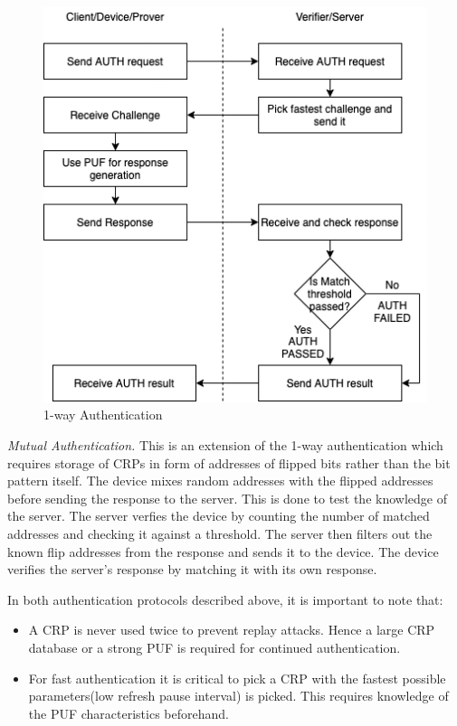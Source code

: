 \documentclass[journal, a4paper]{IEEEtran}
\begin{document}
\begin{figure}[!hbt]
    \begin{center}
    \includegraphics[scale=0.5]{figs/authentication.png}
    \caption{1-way Authentication}
    \label{fig:one_way}
    \end{center}
\end{figure}

\textit{Mutual Authentication.} This is an extension of the 1-way authentication which requires storage of CRPs in form of addresses of flipped bits rather than the bit pattern itself. The device mixes random addresses with the flipped addresses before sending the response to the server. This is done to test the knowledge of the server. The server verfies the device by counting the number of matched addresses and checking it against a threshold. The server then filters out the known flip addresses from the response and sends it to the device. The device verifies the server's response by matching it with its own response.

In both authentication protocols described above, it is important to note that:
\begin{itemize}
    \item A CRP is never used twice to prevent replay attacks. Hence a large CRP database or a strong PUF is required for continued authentication.
    \item For fast authentication it is critical to pick a CRP with the fastest possible parameters(low refresh pause interval) is picked. This requires knowledge of the PUF characteristics beforehand.
\end{itemize}
\end{document}
